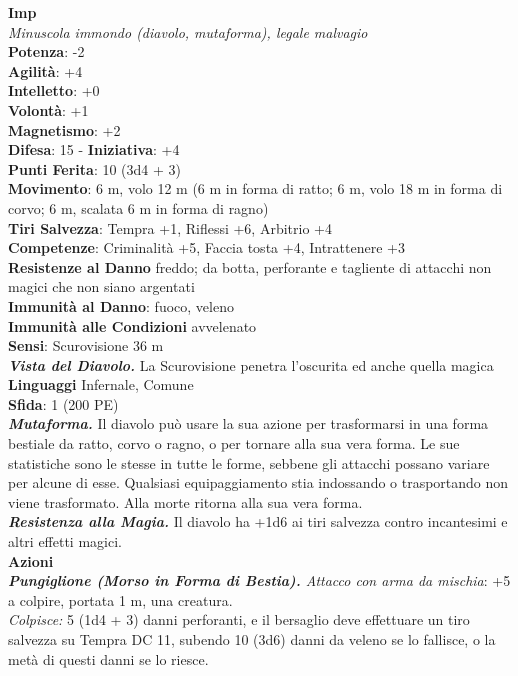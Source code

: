 \begin{multicols}{2}
\medskip\textbf{Imp}\\
\emph{Minuscola immondo (diavolo, mutaforma), legale malvagio}\\
\textbf{Potenza}: -2\\
\textbf{Agilità}: +4\\
\textbf{Intelletto}: +0\\
\textbf{Volontà}: +1\\
\textbf{Magnetismo}: +2\\
\textbf{Difesa}: 15 - \textbf{Iniziativa}: +4\\
\textbf{Punti Ferita}: 10 (3d4 + 3)\\
\textbf{Movimento}: 6 m, volo 12 m (6 m in forma di ratto; 6 m, volo 18 m in forma di corvo; 6 m, scalata 6 m in forma di ragno)\\
\textbf{Tiri Salvezza}: Tempra +1, Riflessi +6, Arbitrio +4\\
\textbf{Competenze}: Criminalità +5, Faccia tosta +4, Intrattenere +3\\
\textbf{Resistenze al Danno} freddo; da botta, perforante e tagliente di attacchi non magici che non siano argentati\\
\textbf{Immunità al Danno}: fuoco, veleno\\
\textbf{Immunità alle Condizioni} avvelenato\\
\textbf{Sensi}: Scurovisione 36 m\\
\emph{\textbf{Vista del Diavolo.}} La Scurovisione penetra l'oscurita ed anche quella magica\\
\textbf{Linguaggi} Infernale, Comune\\
\textbf{Sfida}: 1 (200 PE)\smallskip\\
\emph{\textbf{Mutaforma.}} Il diavolo può usare la sua azione per trasformarsi in una forma bestiale da ratto, corvo o ragno, o per tornare alla sua vera forma. Le sue statistiche sono le stesse in tutte le forme, sebbene gli attacchi possano variare per alcune di esse. Qualsiasi equipaggiamento stia indossando o trasportando non viene trasformato. Alla morte ritorna alla sua vera forma. \\
\emph{\textbf{Resistenza alla Magia.}} Il diavolo ha +1d6 ai tiri salvezza contro incantesimi e altri effetti magici.\\
\smallskip\textbf{Azioni}\\
\emph{\textbf{Pungiglione (Morso in Forma di Bestia).} Attacco con arma da mischia}: +5 a colpire, portata 1 m, una creatura.\\
\emph{Colpisce:} 5 (1d4 + 3) danni perforanti, e il bersaglio deve effettuare un tiro salvezza su Tempra DC 11, subendo 10 (3d6) danni da veleno se lo fallisce, o la metà di questi danni se lo riesce.\\

\end{multicols}
